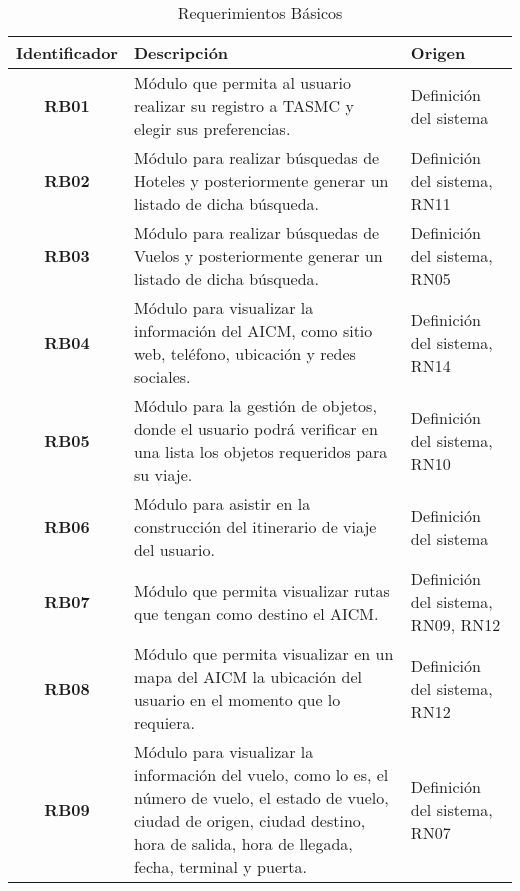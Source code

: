 \begin{table}
	\begin{center}
		\begin{tabular}{|c|p{8.4cm}|p{2.5cm}|}
			\hline \rowcolor[RGB]{51,153,255} 
				\textcolor{blanco}{\bf Identificador} &
				\textcolor{blanco}{\bf Descripción} &
				\textcolor{blanco}{\bf Origen} \\
			\hline 
				\textbf{RB01} &
				Módulo que permita al usuario realizar su registro a TASMC y elegir sus preferencias. &
				Definición del sistema  \\
      		\hline \rowcolor[RGB]{240,248,255}
      			\textbf{RB02} &
				Módulo para realizar búsquedas de Hoteles y posteriormente generar un listado de dicha búsqueda. &
				Definición del sistema, RN11 \\
			\hline 
				\textbf{RB03} &
				Módulo para realizar búsquedas de Vuelos y posteriormente generar un listado de dicha búsqueda. &
				Definición del sistema, RN05 \\ 
			\hline \rowcolor[RGB]{240,248,255}
				\textbf{RB04} &
				Módulo para visualizar la información del AICM, como sitio web, teléfono, ubicación y redes sociales. &
				Definición del sistema, RN14 \\ 
			\hline 
				\textbf{RB05} &
				Módulo para la gestión de objetos, donde el usuario podrá verificar en una lista los objetos requeridos para su viaje. &
				Definición del sistema, RN10 \\ 
			\hline \rowcolor[RGB]{240,248,255}
				\textbf{RB06} &
				Módulo para asistir en la construcción del itinerario de viaje del usuario. &
				Definición del sistema \\ 
			\hline 
				\textbf{RB07} &
				Módulo que permita visualizar rutas que tengan como destino el AICM. &
				Definición del sistema, RN09, RN12 \\ 
			\hline \rowcolor[RGB]{240,248,255}
				\textbf{RB08} &
				Módulo que permita visualizar en un mapa del AICM la ubicación del usuario en el momento que lo requiera. &
				Definición del sistema, RN12 \\ 
			\hline 
				\textbf{RB09} &
				Módulo para visualizar la información del vuelo, como lo es, el número de vuelo, el estado de vuelo, ciudad de origen, ciudad destino, hora de salida, hora de llegada, fecha, terminal y puerta. &
				Definición del sistema, RN07 \\ 
			\hline 
		\end{tabular}
	\end{center}
	\caption[Requerimientos Básicos]{Requerimientos Básicos} 
	\label{tab:reqBasicos}
\end{table}
\clearpage
\newpage
